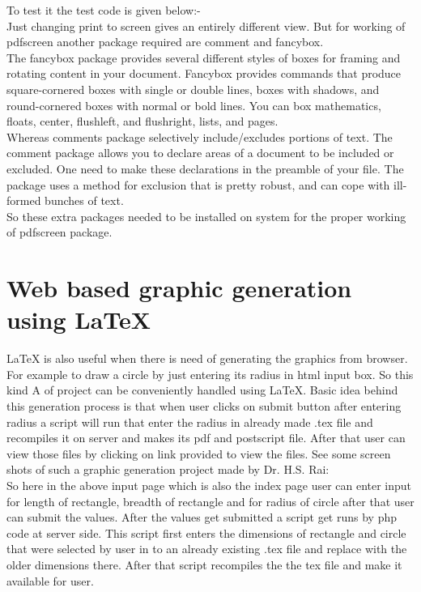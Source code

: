 \noindent To test it the test code is given below:-\\
Just changing print to screen gives an entirely different view. But for working of pdfscreen another package required are comment and fancybox.\\

\noindent The fancybox package provides several different styles of boxes for framing and rotating content in your document. Fancybox provides commands that produce square-cornered boxes with single or double lines, boxes with shadows, and round-cornered boxes with normal or bold lines. You can box mathematics, floats, center, flushleft, and flushright, lists, and pages.\\
 	
\noindent Whereas comments package selectively include/excludes portions of text. The comment package allows you to declare areas of a document to be included or excluded. One need to make these declarations in the preamble of your file. The package uses a method for exclusion that is pretty robust, and can cope with ill-formed bunches of text.\\

\noindent So these extra packages needed to be installed on system for the proper working of pdfscreen package.
\section{Web based graphic generation using \LaTeX{}}
\LaTeX{} is also useful when there is need of generating the graphics from browser. For
example to draw a circle by just entering its radius in html input box. So this kind
A
of project can be conveniently handled using \LaTeX{}. Basic idea behind this generation
process is that when user clicks on submit button after entering radius a script will run
that enter the radius in already made .tex file and recompiles it on server and makes its
pdf and postscript file. After that user can view those files by clicking on link provided
to view the files. See some screen shots of such a graphic generation project made by
Dr. H.S. Rai:\\
So here in the above input page which is also the index page user can enter input
for length of rectangle, breadth of rectangle and for radius of circle after that user can submit the values. After the values get submitted a script get runs by php code at server
side. This script first enters the dimensions of rectangle and circle that were selected by
user in to an already existing .tex file and replace with the older dimensions there. After
that script recompiles the the tex file and make it available for user.\\
	
